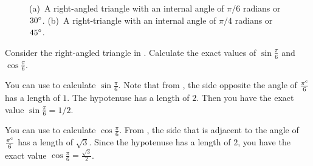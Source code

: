 \documentclass[a4paper,oneside,12pt]{article}
\begin{document}
\begin{figure}[!htbp]
\centering
{}
\qquad\qquad
\caption{%
  (a)~A right-angled triangle with an internal angle of $\pi / 6$
  radians or $\degree{30}$.  (b)~A right-triangle with an internal
  angle of $\pi / 4$ radians or $\degree{45}$.
}
\label{fig:right_triangle_30_45_degrees}
\end{figure}

\begin{example}
Consider the right-angled triangle in
.  Calculate the exact values
of $\sin\frac{\pi}{6}$ and $\cos\frac{\pi}{6}$.
\end{example}

\begin{solution}
You can use  to calculate
$\sin\frac{\pi}{6}$.  Note that from
, the side opposite the angle of
$\frac{\radian{\pi}}{6}$ has a length of $1$.  The hypotenuse has a
length of $2$.  Then you have the exact value
$\sin\frac{\pi}{6} = 1 / 2$.

You can use  to calculate
$\cos\frac{\pi}{6}$.  From , the
side that is adjacent to the angle of $\frac{\radian{\pi}}{6}$ has a
length of $\sqrt{3}$.  Since the hypotenuse has a length of $2$, you
have the exact value $\cos\frac{\pi}{6} = \frac{\sqrt{3}}{2}$.
\end{solution}
\end{document}
